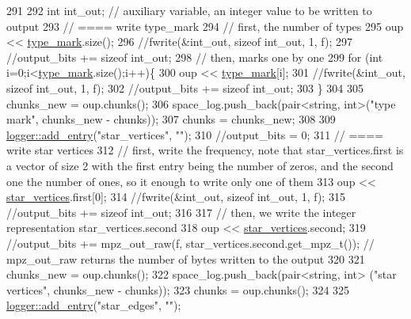 \begin{DoxyCode}
291 
292   \textcolor{keywordtype}{int} int\_out; \textcolor{comment}{// auxiliary variable, an integer value to be written to output}
293   \textcolor{comment}{// ==== write type\_mark}
294   \textcolor{comment}{// first, the number of types}
295   oup <<  \hyperlink{classmarked__graph__compressed_a86b00223525703e973415cbc9c94da68}{type\_mark}.size();
296   \textcolor{comment}{//fwrite(&int\_out, sizeof int\_out, 1, f);}
297   \textcolor{comment}{//output\_bits += sizeof int\_out;}
298   \textcolor{comment}{// then, marks one by one}
299   \textcolor{keywordflow}{for} (\textcolor{keywordtype}{int} i=0;i<\hyperlink{classmarked__graph__compressed_a86b00223525703e973415cbc9c94da68}{type\_mark}.size();i++)\{
300     oup <<  \hyperlink{classmarked__graph__compressed_a86b00223525703e973415cbc9c94da68}{type\_mark}[i];
301     \textcolor{comment}{//fwrite(&int\_out, sizeof int\_out, 1, f);}
302     \textcolor{comment}{//output\_bits += sizeof int\_out;}
303   \}
304 
305   chunks\_new = oup.chunks();
306   space\_log.push\_back(pair<string, int>(\textcolor{stringliteral}{"type mark"}, chunks\_new - chunks));
307   chunks = chunks\_new;
308 
309   \hyperlink{classlogger_a710163deb17bc81f70d53d285b8ac9ac}{logger::add\_entry}(\textcolor{stringliteral}{"star\_vertices"}, \textcolor{stringliteral}{""});
310   \textcolor{comment}{//output\_bits = 0;}
311   \textcolor{comment}{// ==== write star vertices}
312   \textcolor{comment}{// first, write the frequency, note that star\_vertices.first is a vector of size 2 with the first entry
       being the number of zeros, and the second one the number of ones, so it enough to write only one of them}
313   oup << \hyperlink{classmarked__graph__compressed_a7a4ced4586e2e353f9076bd447df5208}{star\_vertices}.first[0];
314   \textcolor{comment}{//fwrite(&int\_out, sizeof int\_out, 1, f);}
315   \textcolor{comment}{//output\_bits += sizeof int\_out;}
316 
317   \textcolor{comment}{// then, we write the integer representation star\_vertices.second}
318   oup << \hyperlink{classmarked__graph__compressed_a7a4ced4586e2e353f9076bd447df5208}{star\_vertices}.second;
319   \textcolor{comment}{//output\_bits +=  mpz\_out\_raw(f, star\_vertices.second.get\_mpz\_t()); // mpz\_out\_raw returns the number of
       bytes written to the output}
320 
321   chunks\_new = oup.chunks();
322   space\_log.push\_back(pair<string, int> (\textcolor{stringliteral}{"star vertices"}, chunks\_new - chunks));
323   chunks = oup.chunks();
324 
325   \hyperlink{classlogger_a710163deb17bc81f70d53d285b8ac9ac}{logger::add\_entry}(\textcolor{stringliteral}{"star\_edges"}, \textcolor{stringliteral}{""});

\end{DoxyCode}
